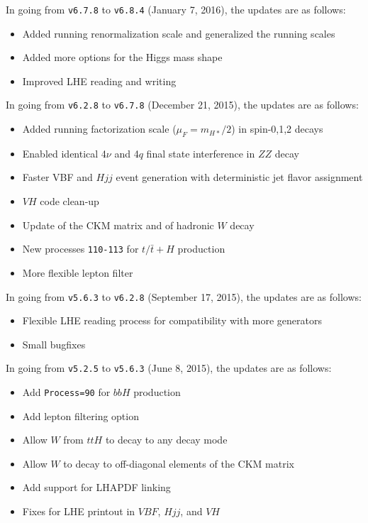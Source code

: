 \documentclass[aps,superscriptaddress,nofootinbib]{revtex4}
\begin{document}
\noindent
In going from \verb|v6.7.8| to \verb|v6.8.4| (January 7, 2016), the updates are as follows:

\begin{itemize}
\item Added running renormalization scale and generalized the running scales
\item Added more options for the Higgs mass shape
\item Improved LHE reading and writing
\end{itemize}

\noindent
In going from \verb|v6.2.8| to \verb|v6.7.8| (December 21, 2015), the updates are as follows:

\begin{itemize}
\item Added running factorization scale ($\mu_F=m_{H*}/2$) in spin-0,1,2 decays
\item Enabled identical 4$\nu$ and 4$q$ final state interference in $ZZ$ decay
\item Faster VBF and $Hjj$ event generation with deterministic jet flavor assignment
\item $VH$ code clean-up
\item Update of the CKM matrix and of hadronic $W$ decay
\item New processes \verb|110-113| for $t/\bar{t}+H$ production
\item More flexible lepton filter
\end{itemize}

\noindent
In going from \verb|v5.6.3| to \verb|v6.2.8| (September 17, 2015), the updates are as follows:

\begin{itemize}
\item Flexible LHE reading process for compatibility with more generators
\item Small bugfixes
\end{itemize}

\noindent
In going from \verb|v5.2.5| to \verb|v5.6.3| (June 8, 2015), the updates are as follows:

\begin{itemize}
\item Add \verb|Process=90| for $bbH$ production
\item Add lepton filtering option
\item Allow $W$ from $ttH$ to decay to any decay mode
\item Allow $W$ to decay to off-diagonal elements of the CKM matrix
\item Add support for LHAPDF linking
\item Fixes for LHE printout in $VBF$, $Hjj$, and $VH$
\end{itemize}
\end{document}
